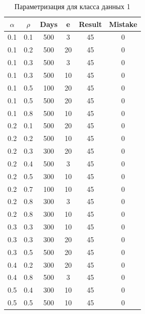 \begin{center}
    \captionsetup{justification=raggedright,singlelinecheck=off}
    \begin{longtable}[c]{|c|c|c|c|c|c|}
    \caption{Параметризация для класса данных 1\label{tbl:table_kd1}} 
    	\\ \hline
        $\alpha$ & $\rho$ & Days & e & Result & Mistake \\ \hline
        0.1 &  0.1 &  500 &    3 &    45 & 0 \\ \hline
        0.1 &  0.2 &  500 &   20 &    45 &     0 \\ \hline
        0.1 &  0.3 &  500 &    3 &    45 &     0 \\ \hline
        0.1 &  0.3 &  500 &   10 &    45 &     0 \\ \hline
        0.1 &  0.5 &  100 &   20 &    45 &     0 \\ \hline
        0.1 &  0.5 &  500 &   20 &    45 &     0 \\ \hline
        0.1 &  0.8 &  500 &   10 &    45 &     0 \\ \hline
        0.2 &  0.1 &  500 &   20 &    45 &     0 \\ \hline
        0.2 &  0.2 &  500 &   10 &    45 &     0 \\ \hline
        0.2 &  0.3 &  300 &   20 &    45 &     0 \\ \hline
        0.2 &  0.4 &  500 &    3 &    45 &     0 \\ \hline
        0.2 &  0.5 &  300 &   10 &    45 &     0 \\ \hline
        0.2 &  0.7 &  100 &   10 &    45 &     0 \\ \hline
        0.2 &  0.8 &  300 &    3 &    45 &     0 \\ \hline
        0.2 &  0.8 &  300 &   10 &    45 &     0 \\ \hline
        0.3 &  0.3 &  300 &   10 &    45 &     0 \\ \hline
        0.3 &  0.3 &  300 &   20 &    45 &     0 \\ \hline
        0.3 &  0.5 &  500 &   20 &    45 &     0 \\ \hline
        0.4 &  0.2 &  300 &   20 &    45 &     0 \\ \hline
        0.4 &  0.8 &  500 &    3 &    45 &     0 \\ \hline
        0.5 &  0.4 &  300 &   10 &    45 &     0 \\ \hline
        0.5 &  0.5 &  500 &   10 &    45 &     0 \\ \hline

\end{longtable}
\end{center}
